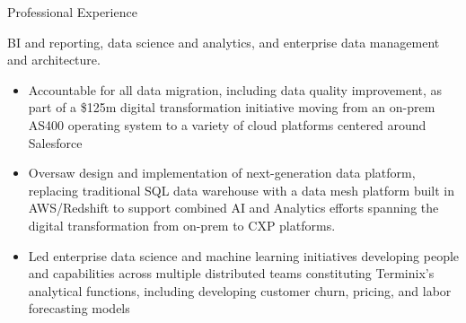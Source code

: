 \documentclass[letterpaper,10pt]{cvclean}
\begin{document}
\begin{experience}{Professional Experience}
\begin{job}
{      BI and reporting, data science and analytics, and enterprise data
      management and architecture.
    \begin{itemize}
    \item Accountable for all data migration, including data quality
      improvement, as part of a \$125m digital transformation initiative moving
      from an on-prem AS400 operating system to a variety of cloud platforms
      centered around Salesforce
    \item Oversaw design and implementation of next-generation data platform,
      replacing traditional SQL data warehouse with a data mesh platform built
      in AWS/Redshift to support combined AI and Analytics efforts spanning the
      digital transformation from on-prem to CXP platforms.
    \item Led enterprise data science and machine learning initiatives
      developing people and capabilities across multiple distributed teams
      constituting Terminix's analytical functions, including developing
      customer churn, pricing, and labor forecasting models
    \end{itemize}}
 \end{job} 
\begin{job}
\end{job}
\begin{job}


\end{job}
\end{experience}
\end{document}
